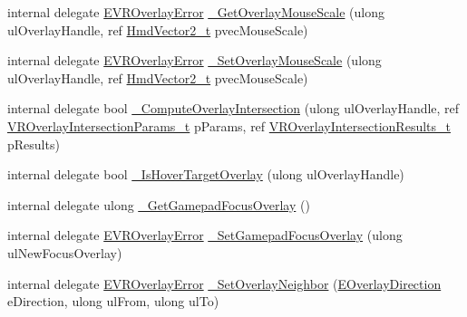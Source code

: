 \begin{DoxyCompactItemize}
\item 
internal delegate \mbox{\hyperlink{namespace_valve_1_1_v_r_aaee5c5144f42b7969d45b854f51b0c18}{E\+V\+R\+Overlay\+Error}} \mbox{\hyperlink{struct_valve_1_1_v_r_1_1_i_v_r_overlay_a2b69731883d25838d42be3fe85fa64b0}{\+\_\+\+Get\+Overlay\+Mouse\+Scale}} (ulong ul\+Overlay\+Handle, ref \mbox{\hyperlink{struct_valve_1_1_v_r_1_1_hmd_vector2__t}{Hmd\+Vector2\+\_\+t}} pvec\+Mouse\+Scale)
\item 
internal delegate \mbox{\hyperlink{namespace_valve_1_1_v_r_aaee5c5144f42b7969d45b854f51b0c18}{E\+V\+R\+Overlay\+Error}} \mbox{\hyperlink{struct_valve_1_1_v_r_1_1_i_v_r_overlay_a754c67b5ba2654c82e4f4e066d87af9f}{\+\_\+\+Set\+Overlay\+Mouse\+Scale}} (ulong ul\+Overlay\+Handle, ref \mbox{\hyperlink{struct_valve_1_1_v_r_1_1_hmd_vector2__t}{Hmd\+Vector2\+\_\+t}} pvec\+Mouse\+Scale)
\item 
internal delegate bool \mbox{\hyperlink{struct_valve_1_1_v_r_1_1_i_v_r_overlay_a16aaf361f64b74515f0f9455b9e1aaaf}{\+\_\+\+Compute\+Overlay\+Intersection}} (ulong ul\+Overlay\+Handle, ref \mbox{\hyperlink{struct_valve_1_1_v_r_1_1_v_r_overlay_intersection_params__t}{V\+R\+Overlay\+Intersection\+Params\+\_\+t}} p\+Params, ref \mbox{\hyperlink{struct_valve_1_1_v_r_1_1_v_r_overlay_intersection_results__t}{V\+R\+Overlay\+Intersection\+Results\+\_\+t}} p\+Results)
\item 
internal delegate bool \mbox{\hyperlink{struct_valve_1_1_v_r_1_1_i_v_r_overlay_a1590850cc22c3398e21bdeff4eb15bbe}{\+\_\+\+Is\+Hover\+Target\+Overlay}} (ulong ul\+Overlay\+Handle)
\item 
internal delegate ulong \mbox{\hyperlink{struct_valve_1_1_v_r_1_1_i_v_r_overlay_a5d0bd8d9b0f09e1738bc3da860d9a0a1}{\+\_\+\+Get\+Gamepad\+Focus\+Overlay}} ()
\item 
internal delegate \mbox{\hyperlink{namespace_valve_1_1_v_r_aaee5c5144f42b7969d45b854f51b0c18}{E\+V\+R\+Overlay\+Error}} \mbox{\hyperlink{struct_valve_1_1_v_r_1_1_i_v_r_overlay_a52e2a2a1d78d2bc21361fee22beb6b65}{\+\_\+\+Set\+Gamepad\+Focus\+Overlay}} (ulong ul\+New\+Focus\+Overlay)
\item 
internal delegate \mbox{\hyperlink{namespace_valve_1_1_v_r_aaee5c5144f42b7969d45b854f51b0c18}{E\+V\+R\+Overlay\+Error}} \mbox{\hyperlink{struct_valve_1_1_v_r_1_1_i_v_r_overlay_ac035a5a1c1aacd145f1268c402e3fe3d}{\+\_\+\+Set\+Overlay\+Neighbor}} (\mbox{\hyperlink{namespace_valve_1_1_v_r_ad0398c1325c370eb3a4796d89610b868}{E\+Overlay\+Direction}} e\+Direction, ulong ul\+From, ulong ul\+To)
\item 

\end{DoxyCompactItemize}
